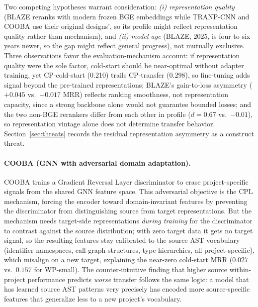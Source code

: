 \documentclass[a4paper,fleqn]{cas-dc}
\begin{document}
Two competing hypotheses warrant consideration: \emph{(i) representation
quality} (BLAZE reranks with modern frozen BGE embeddings while TRANP-CNN
and COOBA use their original designs', so its profile might reflect
representation quality rather than mechanism), and \emph{(ii) model age}
(BLAZE, 2025, is four to six years newer, so the gap might reflect general
progress), not mutually exclusive. Three observations favor the
evaluation-mechanism account: if
representation quality were the sole factor, cold-start should be
near-optimal without adapter training, yet CP-cold-start (0.210) trails
CP-transfer (0.298), so fine-tuning adds signal beyond the pre-trained
representations; BLAZE's gain-to-loss asymmetry ($+0.045$ vs.\ $-0.017$
MRR) reflects ranking smoothness, not representation capacity, since a
strong backbone alone would not guarantee bounded losses; and the two
non-BGE rerankers differ from each other in profile ($d = 0.67$ vs.\
$-0.01$), so representation vintage alone does not determine transfer
behavior. Section~\ref{sec:threats} records the residual representation
asymmetry as a construct threat.

\paragraph{COOBA (GNN with adversarial domain adaptation).}
COOBA trains a Gradient Reversal Layer discriminator to erase
project-specific signals from the shared GNN feature space. This
adversarial objective is the CPL mechanism, forcing the encoder toward
domain-invariant features by preventing the discriminator from
distinguishing source from target representations. But the mechanism needs
target-side representations \emph{during training} for the discriminator
to contrast against the source distribution; with zero target data it gets
no target signal, so the resulting features stay calibrated to the source
AST vocabulary (identifier namespaces, call-graph structures, type
hierarchies, all project-specific), which misalign on a new target,
explaining the near-zero cold-start MRR ($0.027$ vs.\ $0.157$ for
WP-small). The counter-intuitive finding that higher source within-project
performance predicts \emph{worse} transfer follows the same logic: a model
that has learned source AST patterns very precisely has encoded more
source-specific features that generalize less to a new project's
vocabulary.
\end{document}
